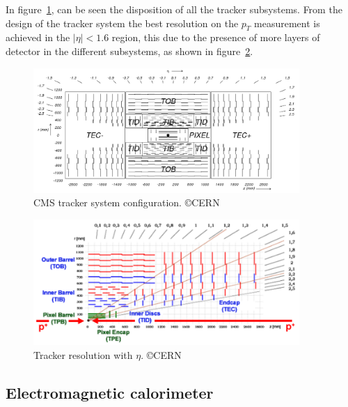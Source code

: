 In figure~\ref{fig:cmstracker}, can be seen the disposition of all the tracker subsystems. From the design of the tracker system the best resolution on the $p_{T}$ measurement is achieved in the $|\eta|<1.6$ region, this due to the presence of more layers of detector in the different subsystems, as shown in figure~\ref{fig:trackerres}. 

\begin{figure}[!Hhtbp]
  \begin{center}
    \includegraphics[width=0.9\textwidth]{figs/fig_cmstracker.png}
    \caption{CMS tracker system configuration. \copyright CERN}
    \label{fig:cmstracker}
  \end{center}
\end{figure}

\begin{figure}[!Hhtbp]
  \begin{center}
    \includegraphics[width=0.9\textwidth]{figs/tracker_resolution.png}
    \caption{Tracker resolution with $\eta$. \copyright CERN}
    \label{fig:trackerres}
  \end{center}
\end{figure}

\subsection{Electromagnetic calorimeter}
\label{sec:ecal}

